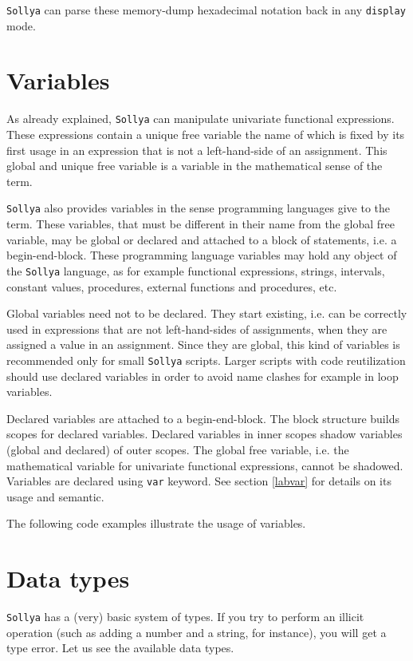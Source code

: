 \documentclass[a4paper]{article}
\newcommand{\key}[1]{\texttt{#1}}
\newcommand{\sollya}{\texttt{Sollya}\xspace}
\begin{document}


\sollya can parse these memory-dump hexadecimal notation back in any \key{display} mode.

\section{Variables}\label{variables}

As already explained, \sollya can manipulate univariate functional
expressions. These expressions contain a unique free variable the name
of which is fixed by its first usage in an expression that is not a
left-hand-side of an assignment. This global and unique free variable is 
a variable in the mathematical sense of the term. 

\sollya also provides variables in the sense programming languages
give to the term.  These variables, that must be different in their
name from the global free variable, may be global or declared and
attached to a block of statements, i.e. a begin-end-block. These
programming language variables may hold any object of the \sollya
language, as for example functional expressions, strings, intervals,
constant values, procedures, external functions and procedures, etc.

Global variables need not to be declared. They start existing,
i.e. can be correctly used in expressions that are not left-hand-sides
of assignments, when they are assigned a value in an assignment. Since
they are global, this kind of variables is recommended only for small
\sollya scripts.  Larger scripts with code reutilization should use
declared variables in order to avoid name clashes for example in loop
variables.

Declared variables are attached to a begin-end-block. The block
structure builds scopes for declared variables. Declared variables in
inner scopes shadow variables (global and declared) of outer
scopes. The global free variable, i.e. the mathematical variable for
univariate functional expressions, cannot be shadowed. Variables are
declared using \key{var} keyword. See section \ref{labvar} for details
on its usage and semantic.

The following code examples illustrate the usage of variables.




\section{Data types}
\sollya has a (very) basic system of types. If you try to perform an illicit operation (such as adding a number and a string, for instance), you will get a type error. Let us see the available data types.
\end{document}

